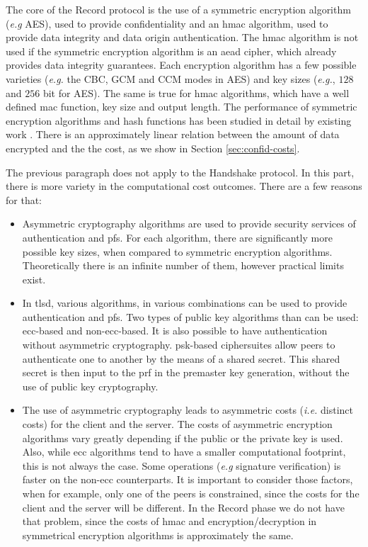 The core of the Record protocol is the use of a symmetric encryption algorithm (\textit{e.g} AES), used to
provide confidentiality and an \gls{hmac} algorithm, used to provide data integrity and data origin authentication.
The \gls{hmac} algorithm is not used if the symmetric encryption algorithm is an \gls{aead} cipher, which already
provides data integrity guarantees. Each encryption algorithm has a few possible varieties (\textit{e.g.} the CBC, GCM and CCM modes in AES)
and key sizes  (\textit{e.g.}, $128$ and $256$ bit for AES). The same is true for \gls{hmac} algorithms, which
have a well defined \gls{mac} function, key size and output length. The performance of symmetric encryption
algorithms and hash functions has been studied in detail by existing work \cite{nadeem2005performance} \cite{mathew2010performance}.
There is an approximately linear relation between the amount of data encrypted and the the cost, as we 
show in Section \ref{sec:confid-costs}.

The previous paragraph does not apply to the Handshake protocol. In this part, there is more variety in the
computational cost outcomes. There are a few reasons for that:

\begin{itemize}

  \item Asymmetric cryptography algorithms are used to provide security services of authentication
  and \gls{pfs}. For each algorithm, there are significantly more possible key sizes, when compared to
  symmetric encryption algorithms. Theoretically there is an infinite number of them, however practical limits exist\cite{lenstra2004key}.

  \item In \gls{tlsd}, various algorithms, in various combinations can be used to provide authentication and \gls{pfs}.
  Two types of public key algorithms than can be used: \gls{ecc}-based and non-\gls{ecc}-based. It is also possible
  to have authentication without asymmetric cryptography. \gls{psk}-based ciphersuites allow peers to
  authenticate one to another by the means of a shared secret. This shared secret is then input to the \gls{prf}
  in the premaster key generation, without the use of public key cryptography.

  \item The use of asymmetric cryptography leads to asymmetric costs (\textit{i.e.} distinct costs) for the client and the server. The costs of asymmetric
  encryption algorithms vary greatly depending if the public or the private key is used. Also, while \gls{ecc}
  algorithms tend to have a smaller computational footprint, this is not always the case.
  Some operations (\textit{e.g} signature verification) is faster on the non-\gls{ecc} counterparts.
  It is important to consider those factors, when for example, only one of the peers is constrained, since the costs for the client and the server will be different.
  In the Record phase we do not have that problem, since the costs of \gls{hmac} and encryption/decryption in
  symmetrical encryption algorithms is approximately the same.

\end{itemize}

